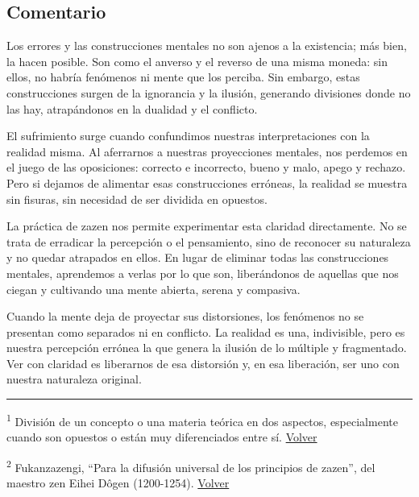 \documentclass[
  a5paperpaper,
]{article}
\begin{document}
\hfill\break

\hypertarget{comentario-24}{%
\subsection{Comentario}\label{comentario-24}}

Los errores y las construcciones mentales no son ajenos a la existencia;
más bien, la hacen posible. Son como el anverso y el reverso de una
misma moneda: sin ellos, no habría fenómenos ni mente que los perciba.
Sin embargo, estas construcciones surgen de la ignorancia y la ilusión,
generando divisiones donde no las hay, atrapándonos en la dualidad y el
conflicto.

El sufrimiento surge cuando confundimos nuestras interpretaciones con la
realidad misma. Al aferrarnos a nuestras proyecciones mentales, nos
perdemos en el juego de las oposiciones: correcto e incorrecto, bueno y
malo, apego y rechazo. Pero si dejamos de alimentar esas construcciones
erróneas, la realidad se muestra sin fisuras, sin necesidad de ser
dividida en opuestos.

La práctica de zazen nos permite experimentar esta claridad
directamente. No se trata de erradicar la percepción o el pensamiento,
sino de reconocer su naturaleza y no quedar atrapados en ellos. En lugar
de eliminar todas las construcciones mentales, aprendemos a verlas por
lo que son, liberándonos de aquellas que nos ciegan y cultivando una
mente abierta, serena y compasiva.

Cuando la mente deja de proyectar sus distorsiones, los fenómenos no se
presentan como separados ni en conflicto. La realidad es una,
indivisible, pero es nuestra percepción errónea la que genera la ilusión
de lo múltiple y fragmentado. Ver con claridad es liberarnos de esa
distorsión y, en esa liberación, ser uno con nuestra naturaleza
original.

\hfill\break

\begin{center}\rule{0.5\linewidth}{0.5pt}\end{center}

\leavevmode{}%
\textsuperscript{1} División de un concepto o una materia teórica en dos
aspectos, especialmente cuando son opuestos o están muy diferenciados
entre sí. \protect\hyperlink{ref1}{Volver}

\textsuperscript{2} Fukanzazengi, ``Para la difusión universal de los
principios de zazen'', del maestro zen Eihei Dôgen (1200-1254).
\protect\hyperlink{ref2}{Volver}
\end{document}

